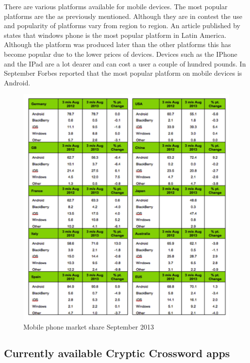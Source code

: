 There are various platforms available for mobile devices. The most popular platforms are the as previously mentioned. Although they are in contest the use and popularity of platforms vary from region to region. An article published by \citet{wpcentral13} states that windows phone is the most popular platform in Latin America. Although the platform was produced later than the other platforms this has become popular due to the lower prices of devices. Devices such as the IPhone and the IPad are a lot dearer and can cost a user a couple of hundred pounds. In September Forbes reported that the most popular platform on mobile devices is Android. 

\newpage
\begin{figure}[!ht]
    \includegraphics[width=\linewidth]{research/mobile_platforms/forbeslist13.png}
    \caption{Mobile phone market share September 2013}
\end{figure}

\begin{flushright}
    \citep{forbes13}
\end{flushright}

\subsection{Currently available Cryptic Crossword apps}

